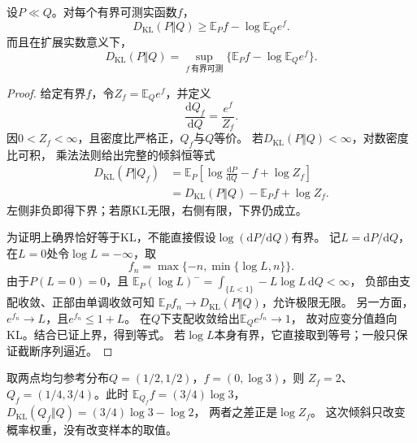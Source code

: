 \begin{theorem}
\label{thm:information-donsker-varadhan}
设\(P\ll Q\)。对每个有界可测实函数\(f\)，
\begin{equation}
  D_{\mathrm{KL}}(P\Vert Q)
  \geq\mathbb E_Pf-\log\mathbb E_Qe^f.
  \label{eq:information-dv-lower}
\end{equation}
而且在扩展实数意义下，
\begin{equation}
  D_{\mathrm{KL}}(P\Vert Q)
  =\sup_{f\ \text{有界可测}}\{\mathbb E_Pf-\log\mathbb E_Qe^f\}.
  \label{eq:information-dv-variational}
\end{equation}
\end{theorem}
\begin{proof}
给定有界\(f\)，令\(Z_f=\mathbb E_Qe^f\)，并定义
\[
  \frac{\mathrm dQ_f}{\mathrm dQ}=\frac{e^f}{Z_f}.
\]
因\(0<Z_f<\infty\)，且密度比严格正，\(Q_f\)与\(Q\)等价。
若\(D_{\mathrm{KL}}(P\Vert Q)<\infty\)，对数密度比可积，
乘法法则给出完整的倾斜恒等式
\[
\begin{aligned}
  D_{\mathrm{KL}}(P\Vert Q_f)
  &=\mathbb E_P\left[\log\frac{\mathrm dP}{\mathrm dQ}-f+\log Z_f\right]\\
  &=D_{\mathrm{KL}}(P\Vert Q)-\mathbb E_Pf+\log Z_f.
\end{aligned}
\]
左侧非负即得下界；若原KL无限，右侧有限，下界仍成立。

为证明上确界恰好等于KL，不能直接假设\(\log(\mathrm dP/\mathrm dQ)\)有界。
记\(L=\mathrm dP/\mathrm dQ\)，在\(L=0\)处令\(\log L=-\infty\)，取
\[
  f_n=\max\{-n,\min\{\log L,n\}\}.
\]
由于\(P(L=0)=0\)，且
\(\mathbb E_P(\log L)^-=\int_{\{L<1\}}-L\log L\,\mathrm dQ<\infty\)，
负部由支配收敛、正部由单调收敛可知
\(\mathbb E_Pf_n\to D_{\mathrm{KL}}(P\Vert Q)\)，允许极限无限。
另一方面，\(e^{f_n}\to L\)，且\(e^{f_n}\leq1+L\)。
在\(Q\)下支配收敛给出\(\mathbb E_Qe^{f_n}\to1\)，
故对应变分值趋向KL。结合已证上界，得到等式。
若\(\log L\)本身有界，它直接取到等号；一般只保证截断序列逼近。
\end{proof}

取两点均匀参考分布\(Q=(1/2,1/2)\)，\(f=(0,\log3)\)，则
\(Z_f=2\)、\(Q_f=(1/4,3/4)\)。此时
\(\mathbb E_{Q_f}f=(3/4)\log3\)，
\(D_{\mathrm{KL}}(Q_f\Vert Q)=(3/4)\log3-\log2\)，
两者之差正是\(\log Z_f\)。
这次倾斜只改变概率权重，没有改变样本的取值。

